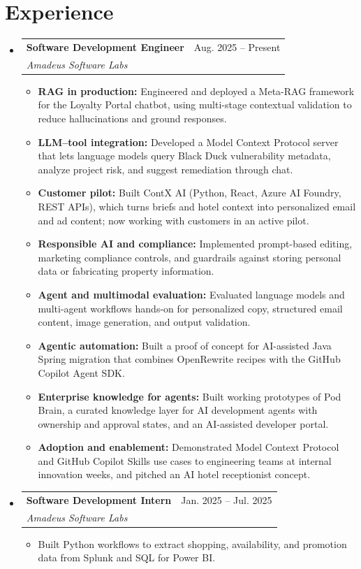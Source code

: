\documentclass[a4paper,11pt]{article}
\makeatletter
\newcommand{\entry}[4]{\item\begin{tabularx}{\textwidth}{@{}Xr@{}}\textbf{#1}& #2\\\textit{\small #3}&\textit{\small #4}\end{tabularx}\vspace{-5pt}}
\newcommand{\bulletpoint}[1]{\item\small{#1}}
\makeatother
\begin{document}
\section{Experience}
\begin{itemize}[leftmargin=0in,label={}]
  \entry{Software Development Engineer}{Aug. 2025 -- Present}{Amadeus Software Labs}{}
  \begin{itemize}
    \bulletpoint{\textbf{RAG in production:} Engineered and deployed a Meta-RAG framework for the Loyalty Portal chatbot, using multi-stage contextual validation to reduce hallucinations and ground responses.}
    \bulletpoint{\textbf{LLM--tool integration:} Developed a Model Context Protocol server that lets language models query Black Duck vulnerability metadata, analyze project risk, and suggest remediation through chat.}
    \bulletpoint{\textbf{Customer pilot:} Built ContX AI (Python, React, Azure AI Foundry, REST APIs), which turns briefs and hotel context into personalized email and ad content; now working with customers in an active pilot.}
    \bulletpoint{\textbf{Responsible AI and compliance:} Implemented prompt-based editing, marketing compliance controls, and guardrails against storing personal data or fabricating property information.}
    \bulletpoint{\textbf{Agent and multimodal evaluation:} Evaluated language models and multi-agent \mbox{workf{}lows} hands-on for personalized copy, structured email content, image generation, and output validation.}
    \bulletpoint{\textbf{Agentic automation:} Built a proof of concept for AI-assisted Java Spring migration that combines OpenRewrite recipes with the GitHub Copilot Agent SDK.}
    \bulletpoint{\textbf{Enterprise knowledge for agents:} Built working prototypes of Pod Brain, a curated knowledge layer for AI development agents with ownership and approval states, and an AI-assisted developer portal.}
    \bulletpoint{\textbf{Adoption and enablement:} Demonstrated Model Context Protocol and GitHub Copilot Skills use cases to engineering teams at internal innovation weeks, and pitched an AI hotel receptionist concept.}
  \end{itemize}
  \entry{Software Development Intern}{Jan. 2025 -- Jul. 2025}{Amadeus Software Labs}{}
  \begin{itemize}
    \bulletpoint{Built Python workf{}lows to extract shopping, availability, and promotion data from Splunk and SQL for Power BI.}
  \end{itemize}
\end{itemize}
\end{document}
